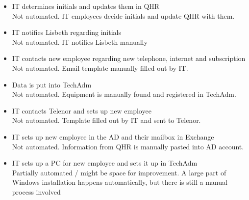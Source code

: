 \begin{itemize}
	\item{IT determines initials and updates them in QHR}\\
		Not automated. IT employees decide initials and update QHR with them.
	
	\item{IT notifies Lisbeth regarding initials}\\
		Not automated. IT notifies Lisbeth manually
	
	\item{IT contacts new employee regarding new telephone, internet and subscription}\\
		Not automated. Email template manually filled out by IT.
	
	\item{Data is put into TechAdm}\\
		Not automated. Equipment is manually found and registered in TechAdm.
	
	\item{IT contacts Telenor and sets up new employee}\\
		Not automated. Template filled out by IT and sent to Telenor.
	
	\item{IT sets up new employee in the AD and their mailbox in Exchange}\\
		Not automated. Information from QHR is manually pasted into AD account.
	
	\item{IT sets up a PC for new employee and sets it up in TechAdm}\\
		Partially automated / might be space for improvement. A large part of Windows installation happens automatically, but there is still a manual process involved
	
\end{itemize}